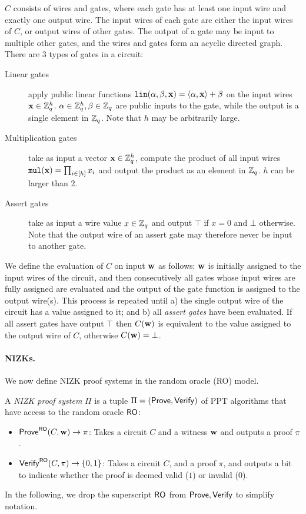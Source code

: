 $C$ consists of wires and gates, where each gate has at least one input wire and exactly one output wire. The input wires of each gate are either the input wires of $C$, or output wires of other gates. The output of a gate may be input to multiple other gates, and the wires and gates form an acyclic directed graph. There are $3$ types of gates in a circuit:
\begin{description}
\item[Linear gates] apply public linear functions $\mathtt{lin}(\mathbf{\alpha},\beta,\mathbf{x})=\langle \mathbf{\alpha},\mathbf{x}\rangle +\beta$ on the input wires $\mathbf{x}\in \mathbb{Z}_q^h$. $\mathbf{\alpha} \in \mathbb{Z}_q^h, \beta \in \mathbb{Z}_q$ are public inputs to the gate, while the output is a single element in $\mathbb{Z}_q$. Note that $h$ may be arbitrarily large.
\item[Multiplication gates]  take as input a vector $\mathbf{x} \in \mathbb{Z}_q^h$, compute the product of all input wires $\mathtt{mul}(\mathbf{x})=\prod_{i\in[h]} x_i $ and output the product as an element in $\mathbb{Z}_q$. $h$ can be larger than 2.
\item[Assert gates] take as input a wire value $x\in \mathbb{Z}_q$ and output $\top$ if $x=0$ and $\bot$ otherwise. Note that the output wire of an assert gate may therefore never be input to another gate.
\end{description}

We define the evaluation of $C$ on input $\mathbf{w}$ as follows:  $\mathbf{w}$ is initially assigned to the input wires of the circuit, and then consecutively all gates whose input wires are fully assigned are evaluated and the output of the gate function is assigned to the output wire(s).
This process is repeated until a) the single output wire of the circuit has a value assigned to it; and b) all \emph{assert gates} have been evaluated. If all assert gates have output $\top$ then $C(\mathbf{w})$ is equivalent to the value assigned to the output wire of $C$, otherwise $C(\mathbf{w})=\bot$.

\paragraph{NIZKs.}
We now define NIZK proof systems in the random oracle (RO) model. 
\begin{definition}\label{def:nizk}
A \emph{NIZK proof system} $\Pi$  is a tuple $\Pi = ( \mathsf{Prove}, \mathsf{Verify})$ of PPT algorithms that have access to the random oracle $\mathsf{RO}$:
\begin{itemize}
    \item $\mathsf{Prove}^{\mathsf{RO}}(C,\mathbf{w}) \rightarrow \pi$: Takes a circuit $C$ and a witness $\mathbf{w}$  and outputs a proof $\pi$.
    \item $\mathsf{Verify}^{\mathsf{RO}}(C,\pi) \rightarrow \{0,1\}$: Takes a circuit $C $, and a proof $\pi$, and outputs a bit to indicate whether the proof is deemed valid ($1$) or invalid ($0$).
\end{itemize}
\end{definition}
In the following, we drop the superscript $\mathsf{RO}$ from $\mathsf{Prove},\mathsf{Verify}$ to simplify notation.

